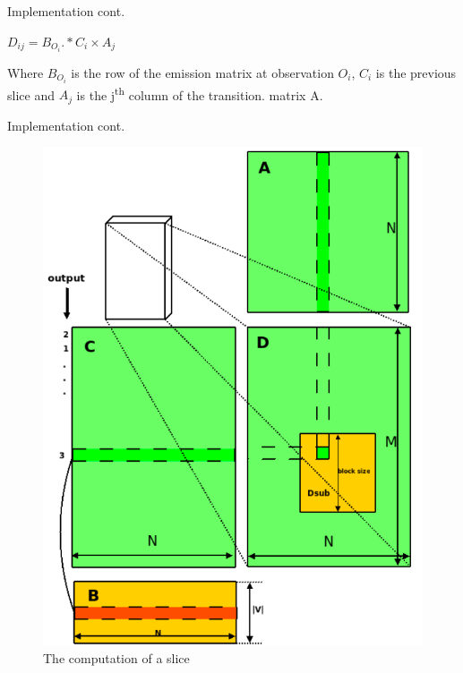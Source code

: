 \documentclass[11pt]{beamer}
\begin{document}
\begin{frame}{Implementation cont.}
\begin{center}

\( D_{ij} = B_{O_i} .* C_i \times A_j \)

\end{center}

Where \( B_{O_i}\) is the row of the emission matrix at observation \(O_i\), \(C_i\) is the previous slice and \(A_j\) is the j\textsuperscript{th} column of the transition. matrix A.
\end{frame}

\begin{frame}{Implementation cont.}
\begin{figure}[H]
\centering

\includegraphics[scale=0.2]{"slice"}
  \caption{The computation of a slice }
\end{figure}
\end{frame}
\end{document}
